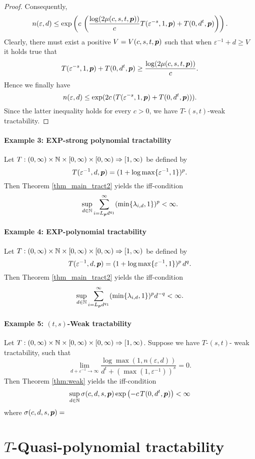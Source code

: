 \documentclass[11pt,a4paper]{article}
\begin{document}
{\begin{proof}
Consequently,
\[
n(\varepsilon, d) \le \exp\left(c\, \left(
\frac{\log (2\mu (c,s,t,\boldsymbol{p}) )}{c}
T(\varepsilon^{-s},1,\boldsymbol{p}) + T(0,d^t,\boldsymbol{p})
\right)\right).
\]
Clearly, there must exist a positive $V=V(c,s,t,\boldsymbol{p})$ such that when $\varepsilon^{-1} +d \ge V$ it holds true that
\[
  T(\varepsilon^{-s},1,\boldsymbol{p}) + T(0,d^t,\boldsymbol{p}) \ge \frac{\log (2\mu (c,s,t,\boldsymbol{p}) )}{c}.
\]
Hence we finally have 
\[
n(\varepsilon,d) \le \exp (2c\, (T(\varepsilon^{-s},1,\boldsymbol{p}) + T(0,d^t,\boldsymbol{p}))).
\]
Since the latter inequality holds for every $c>0$, we have $T$-$(s,t)$-weak tractability.

\end{proof}
}
\paragraph{Example 3: EXP-strong polynomial tractability}

Let $T: (0,\infty) \times \mathbb{N} \times [0,\infty) \times [0,\infty)\Rightarrow [1,\infty)$
be defined by
\[
 T(\varepsilon^{-1},d,\boldsymbol{p})= (1+\log\max\{\varepsilon^{-1},1\})^p.
\]
Then Theorem \ref{thm_main_tract2} yields the iff-condition
\[
 \sup_{d\in\mathbb{N}} \sum_{i=L_{\boldsymbol{p}} d^{q_1}}^\infty (\min\{\lambda_{i,d},1\})^p  < \infty.
\]
\paragraph{Example 4: EXP-polynomial tractability}

Let $T: (0,\infty) \times \mathbb{N} \times [0,\infty) \times [0,\infty)\Rightarrow [1,\infty)$
be defined by
\[
 T(\varepsilon^{-1},d,\boldsymbol{p})= (1+\log \max\{\varepsilon^{-1},1\})^p\, d^q.
\]
Then Theorem \ref{thm_main_tract2} yields the iff-condition
\[
 \sup_{d\in\mathbb{N}} \sum_{i=L_{\boldsymbol{p}} d^{q_1}}^\infty (\min\{\lambda_{i,d},1\})^p d^{-q} < \infty.
\]
\paragraph{Example 5: $(t,s)$-Weak tractability}

Let $T: (0,\infty) \times \mathbb{N} \times [0,\infty) \times [0,\infty)\Rightarrow [1,\infty)$. Suppose we have $T$-$(s,t)$- weak tractability, such that
\[
 \lim_{d+\varepsilon^{-1}\rightarrow\infty} \frac{\log \max(1,n(\varepsilon,d))}{d^t +(\max(1,\varepsilon^{-1}))^s} =0.
\]
Then Theorem \ref{thm:weak} yields the iff-condition
\[
\sup_{d\in\mathbb{N}} \sigma (c,d,s,\boldsymbol{p}) \exp\left(-c\, T(0,d^t,\boldsymbol{p})\right)<\infty
\]
where $\sigma (c,d,s,\boldsymbol{p}) = $

\section{$T$-Quasi-polynomial tractability} \label{sec:qpt}
\end{document}
